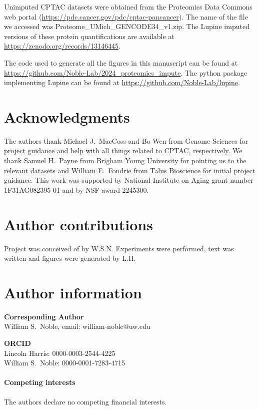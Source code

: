 \documentclass{article}
\begin{document}
Unimputed CPTAC datasets were obtained from the Proteomics Data Commons web portal (\url{https://pdc.cancer.gov/pdc/cptac-pancancer}).
The name of the file we accessed was Proteome\_UMich\_GENCODE34\_v1.zip.
The Lupine imputed versions of these protein quantifications are available at \url{https://zenodo.org/records/13146445}.

The code used to generate all the figures in this manuscript can be found at
\url{https://github.com/Noble-Lab/2024_proteomics_impute}. 
The python package implementing Lupine can be found at \url{https://github.com/Noble-Lab/lupine}. 


 

\section*{Acknowledgments}

The authors thank Michael J.\ MacCoss and Bo Wen from Genome Sciences for project guidance and help with all things related to CPTAC, respectively. 
We thank Samuel H.\ Payne from Brigham Young University for pointing us to the relevant datasets and William E.\ Fondrie from Talus Bioscience for initial project guidance. 
This work was supported by National Institute on Aging grant number 1F31AG082395-01 and by NSF award 2245300.

\section*{Author contributions}
Project was conceived of by W.S.N. Experiments were performed, text was written and figures were generated by L.H. 

\section*{Author information}

\textbf{Corresponding Author} \\
William S.\ Noble, email: william-noble@uw.edu

\textbf{ORCID} \\
Lincoln Harris: 0000-0003-2544-4225 \\
William S.\ Noble: 0000-0001-7283-4715

\paragraph{Competing interests}
The authors declare no competing financial interests.
\end{document}

